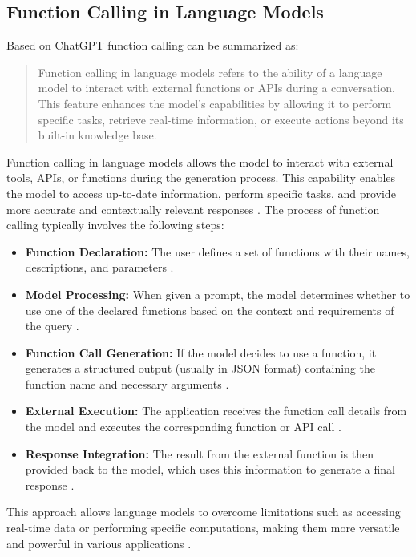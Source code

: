 \newpage
\subsection{Function Calling in Language Models}
Based on ChatGPT function calling can be summarized as:

\begin{quote}
Function calling in language models refers to the ability of a language model to interact with external functions or APIs during a conversation. This feature enhances the model's capabilities by allowing it to perform specific tasks, retrieve real-time information, or execute actions beyond its built-in knowledge base.
\end{quote} \cite{openai2024function}

\noindent
Function calling in language models allows the model to interact with external tools, APIs, or functions during the generation process. This capability enables the model to access up-to-date information, perform specific tasks, and provide more accurate and contextually relevant responses \cite{mistral2024function, openai2024function, google2024function}.
The process of function calling typically involves the following steps:

\begin{itemize}
\item \textbf{Function Declaration:} The user defines a set of functions with their names, descriptions, and parameters \cite{mistral2024function}.

\item \textbf{Model Processing:} When given a prompt, the model determines whether to use one of the declared functions based on the context and requirements of the query \cite{mistral2024function, openai2024function}.

\item \textbf{Function Call Generation:} If the model decides to use a function, it generates a structured output (usually in JSON format) containing the function name and necessary arguments \cite{mistral2024function, openai2024function}.

\item \textbf{External Execution:} The application receives the function call details from the model and executes the corresponding function or API call \cite{mistral2024function, google2024function}.

\item \textbf{Response Integration:} The result from the external function is then provided back to the model, which uses this information to generate a final response \cite{mistral2024function, google2024function}.
\end{itemize}
This approach allows language models to overcome limitations such as accessing real-time data or performing specific computations, making them more versatile and powerful in various applications \cite{google2024function}.

